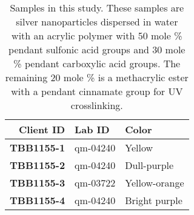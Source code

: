 \begin{table}[h]
\begin{center}
\begin{tabular}{| r | l | l |}
  \hline
  \textbf{Client ID} & \textbf{Lab ID} & \textbf{Color} \\
  \hline
  \textbf{TBB1155-1} & qm-04240        & Yellow         \\
  \hline
  \textbf{TBB1155-2} & qm-04240        & Dull-purple     \\
  \hline
  \textbf{TBB1155-3} & qm-03722        & Yellow-orange   \\
  \hline
  \textbf{TBB1155-4} & qm-04240        & Bright purple    \\
  \hline
\end{tabular}
\end{center}
\caption[Samples]{Samples in this study. These samples are silver
nanoparticles dispersed in water with an acrylic polymer with 50
mole \% pendant sulfonic acid groups and 30 mole \% pendant
carboxylic acid groups. The remaining 20 mole \% is a methacrylic
ester with a pendant cinnamate group for UV crosslinking.}
\label{tab:SampleInfo}
\end{table}

\endinput
